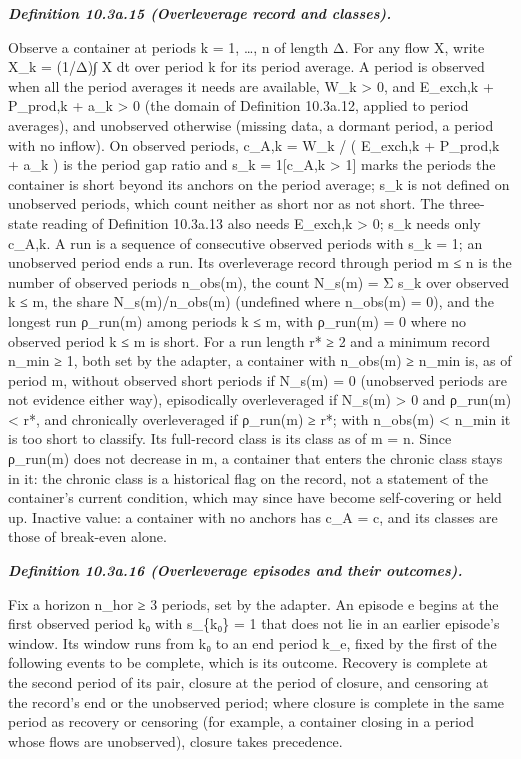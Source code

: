 \documentclass[
]{article}
\begin{document}
\emph{\textbf{Definition 10.3a.15 (Overleverage record and classes).}}

Observe a container at periods k = 1, \ldots, n of length Δ. For any
flow X, write X\_k = (1/Δ)∫ X dt over period k for its period average. A
period is observed when all the period averages it needs are available,
W\_k \textgreater{} 0, and E\_exch,k + P\_prod,k + a\_k \textgreater{} 0
(the domain of Definition 10.3a.12, applied to period averages), and
unobserved otherwise (missing data, a dormant period, a period with no
inflow). On observed periods, c\_A,k = W\_k / ( E\_exch,k + P\_prod,k +
a\_k ) is the period gap ratio and s\_k = 1{[}c\_A,k \textgreater{} 1{]}
marks the periods the container is short beyond its anchors on the
period average; s\_k is not defined on unobserved periods, which count
neither as short nor as not short. The three-state reading of Definition
10.3a.13 also needs E\_exch,k \textgreater{} 0; s\_k needs only c\_A,k.
A run is a sequence of consecutive observed periods with s\_k = 1; an
unobserved period ends a run. Its overleverage record through period m ≤
n is the number of observed periods n\_obs(m), the count N\_s(m) = Σ
s\_k over observed k ≤ m, the share N\_s(m)/n\_obs(m) (undefined where
n\_obs(m) = 0), and the longest run ρ\_run(m) among periods k ≤ m, with
ρ\_run(m) = 0 where no observed period k ≤ m is short. For a run length
r* ≥ 2 and a minimum record n\_min ≥ 1, both set by the adapter, a
container with n\_obs(m) ≥ n\_min is, as of period m, without observed
short periods if N\_s(m) = 0 (unobserved periods are not evidence either
way), episodically overleveraged if N\_s(m) \textgreater{} 0 and
ρ\_run(m) \textless{} r*, and chronically overleveraged if ρ\_run(m) ≥
r*; with n\_obs(m) \textless{} n\_min it is too short to classify. Its
full-record class is its class as of m = n. Since ρ\_run(m) does not
decrease in m, a container that enters the chronic class stays in it:
the chronic class is a historical flag on the record, not a statement of
the container's current condition, which may since have become
self-covering or held up. Inactive value: a container with no anchors
has c\_A = c, and its classes are those of break-even alone.

\emph{\textbf{Definition 10.3a.16 (Overleverage episodes and their
outcomes).}}

Fix a horizon n\_hor ≥ 3 periods, set by the adapter. An episode e
begins at the first observed period k₀ with s\_\{k₀\} = 1 that does not
lie in an earlier episode's window. Its window runs from k₀ to an end
period k\_e, fixed by the first of the following events to be complete,
which is its outcome. Recovery is complete at the second period of its
pair, closure at the period of closure, and censoring at the record's
end or the unobserved period; where closure is complete in the same
period as recovery or censoring (for example, a container closing in a
period whose flows are unobserved), closure takes precedence.
\end{document}
